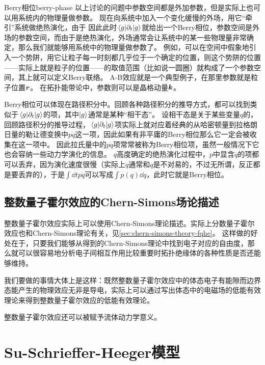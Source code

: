 \begin{back}{Berry相位}{berry-phase}
    以上讨论的问题中参数空间都是外加参数，但是实际上也可以用系统内的物理量做参数。
    现在向系统中加入一个变化缓慢的外场，用它“牵引”系统做绝热演化，由于
    因此此时$\mel{g}{\partial_t}{g}$就给出一个Berry相位，参数空间是外场的参数空间，而由于是绝热演化，外场通常会让系统中的某一些物理量非常确定，那么我们就能够用系统中的物理量做参数了。
    例如，可以在空间中假象地引入一个势阱，用它让粒子每一时刻都几乎位于一个确定的位置，则这个势阱的位置——实际上就是粒子的位置——的取值范围（比如说一圆圈）就构成了一个参数空间，其上就可以定义Berry联络。
    A-B效应就是一个典型例子，在那里参数就是粒子位置$\vb*{r}$。
    在拓扑能带论中，参数则可以是晶格动量$\vb*{k}$。

    Berry相位可以体现在路径积分中。回顾各种路径积分的推导方式，都可以找到类似于$\mel{g}{\partial_t}{g}$的项，其中$\ket{g}$通常是某种“相干态”。
    设相干态是关于某些变量$q$的，回顾路径积分的推导过程，$\mel{g}{\partial_t}{g}$项实际上就对应着经典的从哈密顿量到拉格朗日量的勒让德变换中$p \dot{q}$这一项，因此如果有非平庸的Berry相位那么它一定会被收集在这一项中。
    因此拉氏量中的$p \dot{q}$项常常被称为Berry相位项，虽然一般情况下它也会容纳一些动力学演化的信息。
    $q$高度确定的绝热演化过程中，$p$中显含$\dot{q}$的项都可以丢弃，因为演化速度很慢（实际上$\dot{q}$通常和$q$是不对易的，不过无所谓，反正都是要丢弃的），于是$\int \dd{t} p \dot{q}$可以写成$\int p(q) \dd{q}$，此时它就是Berry相位。
\end{back}

\subsection{整数量子霍尔效应的Chern-Simons场论描述}

整数量子霍尔效应实际上可以使用Chern-Simons理论描述\cite{topological_insulator_concepts}。实际上分数量子霍尔效应也和Chern-Simons理论有关，见\autoref{sec:chern-simons-theory-fqhe}。
这样做的好处在于，只要我们能够从得到的Chern-Simons理论中找到电子对应的自由度，那么就可以很容易地分析电子间相互作用比较重要时拓扑绝缘体的各种性质是否还能够维持。

我们要做的事情大体上是这样：既然整数量子霍尔效应中的体态电子有能隙而边界态能产生的物理效应无非是导电，实际上可以通过写出体态中的电磁场的低能有效理论来得到整数量子霍尔效应的低能有效理论。

整数量子霍尔效应还可以被赋予流体动力学意义\cite{Chan_2016}。

\section{Su-Schrieffer-Heeger模型}

